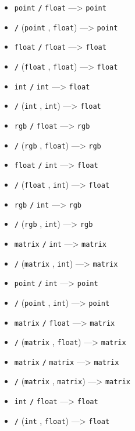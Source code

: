 \documentclass[]{book}
\providecommand{\tightlist}{%
  \setlength{\itemsep}{0pt}\setlength{\parskip}{0pt}}
\theoremstyle{definition}
\theoremstyle{definition}
\theoremstyle{definition}
\theoremstyle{remark}
\begin{document}
\begin{itemize}
\tightlist
\item
  \texttt{point} \textbf{\texttt{/}} \texttt{float} ---\textgreater{}
  \texttt{point}
\item
  \textbf{\texttt{/}} (\texttt{point} , \texttt{float})
  ---\textgreater{} \texttt{point}
\item
  \texttt{float} \textbf{\texttt{/}} \texttt{float} ---\textgreater{}
  \texttt{float}
\item
  \textbf{\texttt{/}} (\texttt{float} , \texttt{float})
  ---\textgreater{} \texttt{float}
\item
  \texttt{int} \textbf{\texttt{/}} \texttt{int} ---\textgreater{}
  \texttt{float}
\item
  \textbf{\texttt{/}} (\texttt{int} , \texttt{int}) ---\textgreater{}
  \texttt{float}
\item
  \texttt{rgb} \textbf{\texttt{/}} \texttt{float} ---\textgreater{}
  \texttt{rgb}
\item
  \textbf{\texttt{/}} (\texttt{rgb} , \texttt{float}) ---\textgreater{}
  \texttt{rgb}
\item
  \texttt{float} \textbf{\texttt{/}} \texttt{int} ---\textgreater{}
  \texttt{float}
\item
  \textbf{\texttt{/}} (\texttt{float} , \texttt{int}) ---\textgreater{}
  \texttt{float}
\item
  \texttt{rgb} \textbf{\texttt{/}} \texttt{int} ---\textgreater{}
  \texttt{rgb}
\item
  \textbf{\texttt{/}} (\texttt{rgb} , \texttt{int}) ---\textgreater{}
  \texttt{rgb}
\item
  \texttt{matrix} \textbf{\texttt{/}} \texttt{int} ---\textgreater{}
  \texttt{matrix}
\item
  \textbf{\texttt{/}} (\texttt{matrix} , \texttt{int}) ---\textgreater{}
  \texttt{matrix}
\item
  \texttt{point} \textbf{\texttt{/}} \texttt{int} ---\textgreater{}
  \texttt{point}
\item
  \textbf{\texttt{/}} (\texttt{point} , \texttt{int}) ---\textgreater{}
  \texttt{point}
\item
  \texttt{matrix} \textbf{\texttt{/}} \texttt{float} ---\textgreater{}
  \texttt{matrix}
\item
  \textbf{\texttt{/}} (\texttt{matrix} , \texttt{float})
  ---\textgreater{} \texttt{matrix}
\item
  \texttt{matrix} \textbf{\texttt{/}} \texttt{matrix} ---\textgreater{}
  \texttt{matrix}
\item
  \textbf{\texttt{/}} (\texttt{matrix} , \texttt{matrix})
  ---\textgreater{} \texttt{matrix}
\item
  \texttt{int} \textbf{\texttt{/}} \texttt{float} ---\textgreater{}
  \texttt{float}
\item
  \textbf{\texttt{/}} (\texttt{int} , \texttt{float}) ---\textgreater{}
  \texttt{float}
\end{itemize}
\end{document}
